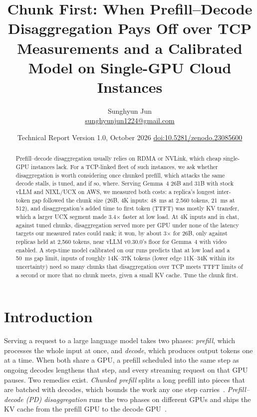 \documentclass[11pt]{article}
\title{Chunk First: When Prefill--Decode Disaggregation Pays Off over TCP\\
\large Measurements and a Calibrated Model on Single-GPU Cloud Instances}
\author{Sunghyun Jun\\ \href{mailto:sunghyunjun1224@gmail.com}{sunghyunjun1224@gmail.com}}
\date{Technical Report \textperiodcentered{} Version 1.0, October 2026 \textperiodcentered{} \href{https://doi.org/10.5281/zenodo.23085600}{doi:10.5281/zenodo.23085600}}
\begin{document}
\maketitle

\begin{abstract}
Prefill--decode disaggregation usually relies on RDMA or NVLink, which cheap single-GPU instances lack. For a TCP-linked fleet of such instances, we ask whether disaggregation is worth considering once chunked prefill, which attacks the same decode stalls, is tuned, and if so, where. Serving Gemma~4 26B and 31B with stock vLLM and NIXL/UCX on AWS, we measured both costs: a replica's longest inter-token gap followed the chunk size (26B, 4K inputs: 48~ms at 2,560 tokens, 21~ms at 512), and disaggregation's added time to first token (TTFT) was mostly KV transfer, which a larger UCX segment made 3.4$\times$ faster at low load. At 4K inputs and in chat, against tuned chunks, disaggregation served more per GPU under none of the latency targets our measured rates could rank; it won, by about 3$\times$ for 26B, only against replicas held at 2,560 tokens, near vLLM v0.30.0's floor for Gemma~4 with video enabled. A step-time model calibrated on our runs predicts that at low load and a 50~ms gap limit, inputs of roughly 14K--37K tokens (lower edge 11K--34K within its uncertainty) need so many chunks that disaggregation over TCP meets TTFT limits of a second or more that no chunk meets, given a small KV cache. Tune the chunk first.
\end{abstract}

\section{Introduction}

Serving a request to a large language model takes two phases: \emph{prefill}, which processes the whole input at once, and \emph{decode}, which produces output tokens one at a time. When both share a GPU, a prefill scheduled into the same step as ongoing decodes lengthens that step, and every streaming request on that GPU pauses. Two remedies exist. \emph{Chunked prefill} splits a long prefill into pieces that are batched with decodes, which bounds the work any one step carries~\cite{sarathi2023,sarathi}. \emph{Prefill--decode (PD) disaggregation} runs the two phases on different GPUs and ships the KV cache from the prefill GPU to the decode GPU~\cite{distserve,splitwise,mooncake}.
\end{document}
